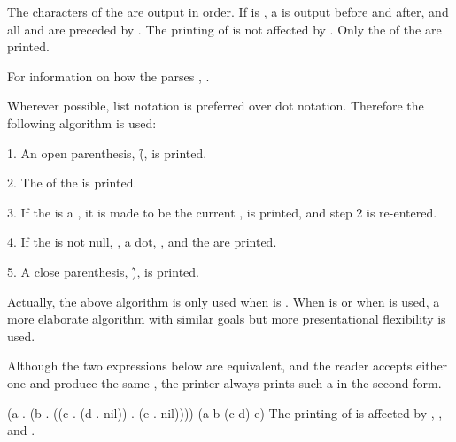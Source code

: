 \endsubsubsubsubsection%

\endsubsubsubsection%

\endsubsubsection%

The characters of the  are output in order.
If  is , a 
is output before and after, and all
 and  are preceded by .
The printing of  is not affected by .
Only the   of the  are printed.

For information on how the  parses ,
\seesection\Doublequote.

\endsubsubsection%

Wherever possible, list notation is preferred over dot notation.  
Therefore the following algorithm is used:

1. An open parenthesis, \f{(}, is printed.

2. The  of the  is printed. 

3. If the  is a , it is made to be the current , 
 is printed, and step 2 is re-entered.

4. If the  is not null, 
,
a dot,
,
and the  are printed.

5. A close parenthesis, \f{)}, is printed.

Actually, the above algorithm is only used when 
is .  When  is  or 
when  is used, a more elaborate algorithm with 
similar goals but more presentational flexibility is used.

Although the two expressions below are equivalent,
and the reader accepts
either one and produce the same , the printer
always prints such a  in the second form.

\code
 (a . (b . ((c . (d . nil)) . (e . nil))))
 (a b (c d) e)
\endcode
The printing of  is affected by ,
, and .



